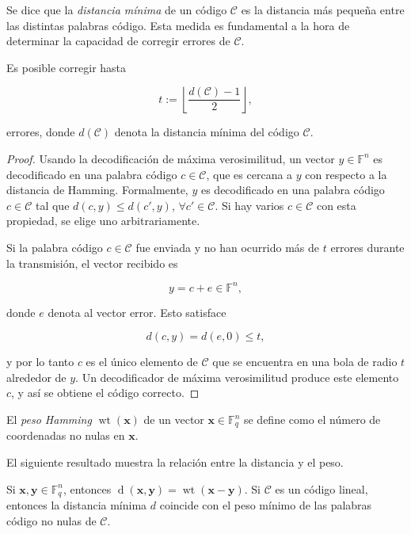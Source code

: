 Se dice que la \emph{distancia mínima} de un código $\mathcal{C}$ es la distancia más pequeña entre las distintas palabras código. Esta medida es fundamental a la hora de determinar la capacidad de corregir errores de $\mathcal{C}$.

\begin{theorem}
    Es posible corregir hasta

    $$t := \left\lfloor \frac{d(\mathcal{C}) - 1}{2} \right\rfloor ,$$

    errores, donde $d(\mathcal{C})$ denota la distancia mínima del código $\mathcal{C}$.
\end{theorem}

\begin{proof}
    Usando la decodificación de máxima verosimilitud, un vector $y \in \mathbb{F}^n$ es decodificado en una palabra código $c  \in \mathcal{C}$, que es cercana a $y$ con respecto a la distancia de Hamming. Formalmente, $y$ es decodificado en una palabra código $c \in \mathcal{C}$ tal que $d(c,y) \leq d(c',y)$, $\forall c' \in \mathcal{C}$. Si hay varios $c \in \mathcal{C}$ con esta propiedad, se elige uno arbitrariamente.

    Si la palabra código $c \in \mathcal{C}$ fue enviada y no han ocurrido más de $t$ errores durante la transmisión, el vector recibido es 

    $$y = c + e \in \mathbb{F}^n,$$

    donde $e$ denota al vector error. Esto satisface 

    $$d(c,y) = d(e,0) \leq t,$$

    y por lo tanto $c$ es el único elemento de $\mathcal{C}$ que se encuentra en una bola de radio $t$ alrededor de $y$. Un decodificador de máxima verosimilitud produce este elemento $c$, y así se obtiene el código correcto.
\end{proof}

\begin{definition}
    El \emph{peso Hamming} $\operatorname{wt}(\mathbf{x})$ de un vector $\mathbf{x} \in \mathbb{F}_q^n$ se define como el número de coordenadas no nulas en $\mathbf{x}$.
\end{definition}

El siguiente resultado muestra la relación entre la distancia y el peso.

\begin{theorem}
    Si $\mathbf{x}, \mathbf{y} \in \mathbb{F}_q^n$, entonces $\operatorname{d}(\mathbf{x},\mathbf{y}) = \operatorname{wt}(\mathbf{x}-\mathbf{y})$. Si $\mathcal{C}$ es un código lineal, entonces la distancia mínima $d$ coincide con el peso mínimo de las palabras código no nulas de $\mathcal{C}$.
\end{theorem}

